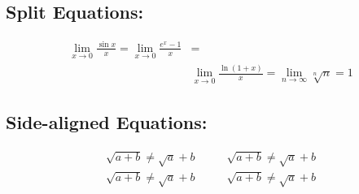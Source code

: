 \documentclass{article}
\begin{document}
	\subsection{Split Equations:}
	\begin{equation}
		\begin{split}
		\lim_{x \rightarrow 0} \frac{\sin x}{x} =
		\lim_{x \rightarrow 0} \frac{e^x-1}{x} &=\\
		&\lim_{x \rightarrow 0} \frac{\ln(1+x)}{x} =
		\lim_{n \rightarrow \infty} \sqrt[n]{n} = 1
		\end{split}
	\end{equation}
	
	\subsection{Side-aligned Equations:}
	\begin{equation*}
		\begin{aligned}
			\sqrt{a+b} \neq \sqrt a+b \\
			\sqrt{a+b} \neq \sqrt a+b 
		\end{aligned} \qquad
		\begin{aligned}
			\sqrt{a+b} \neq \sqrt a+b \\
			\sqrt{a+b} \neq \sqrt a+b
		\end{aligned}
	\end{equation*}
	
\end{document}
